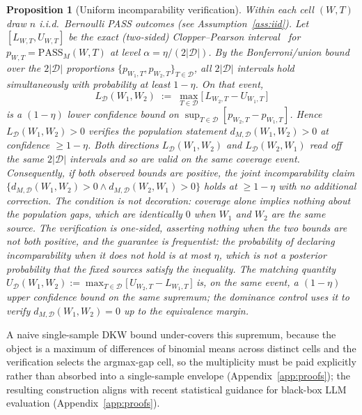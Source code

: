 \documentclass[11pt]{article}
\theoremstyle{plain}
\newtheorem{proposition}{Proposition}
\theoremstyle{definition}
\theoremstyle{remark}
\newcommand{\PASS}{\mathrm{PASS}}
\newcommand{\Dcal}{\mathcal{D}}
\begin{document}
\begin{proposition}[Uniform incomparability verification]
\label{prop:certificate}
Within each cell $(W,T)$ draw $n$ i.i.d.\ Bernoulli PASS outcomes (see
Assumption~\ref{ass:iid}). Let $[L_{W,T},U_{W,T}]$ be the exact (two-sided) Clopper--Pearson
interval~\citep{clopperpearson1934} for $p_{W,T}=\PASS_M(W,T)$ at level
$\alpha = \eta/(2|\Dcal|)$. By the Bonferroni/union bound~\citep{bonferroni1936} over the $2|\Dcal|$
proportions $\{p_{W_1,T},p_{W_2,T}\}_{T\in \Dcal}$, all $2|\Dcal|$ intervals hold simultaneously with
probability at least $1-\eta$. On that event,
\begin{equation}
\label{eq:LD}
L_{\Dcal}(W_1,W_2) \;:=\; \max_{T\in \Dcal}\big[\,L_{W_2,T} - U_{W_1,T}\,\big]
\end{equation}
is a $(1-\eta)$ lower confidence bound on $\sup_{T\in \Dcal}[p_{W_2,T}-p_{W_1,T}]$. Hence
$L_{\Dcal}(W_1,W_2) > 0$ verifies the \emph{population} statement
$d_{M,\Dcal}(W_1,W_2)>0$ at confidence $\ge 1-\eta$.
Both directions $L_{\Dcal}(W_1,W_2)$ and $L_{\Dcal}(W_2,W_1)$ read off the \emph{same} $2|\Dcal|$
intervals and so are valid on the same coverage event. Consequently, \emph{if both observed bounds
are positive}, the joint incomparability claim
$\{d_{M,\Dcal}(W_1,W_2)>0 \wedge d_{M,\Dcal}(W_2,W_1)>0\}$ holds at $\ge 1-\eta$ with no
additional correction. The condition is not decoration: coverage alone implies nothing about the
population gaps, which are identically $0$ when $W_1$ and $W_2$ are the same source. The
verification is one-sided, asserting nothing when the two bounds are not both positive, and the
guarantee is frequentist: the probability of declaring incomparability when it does not hold is at
most $\eta$, which is not a posterior probability that the fixed sources satisfy the inequality. The matching quantity
$U_{\Dcal}(W_1,W_2) := \max_{T\in \Dcal}\big[\,U_{W_2,T} - L_{W_1,T}\,\big]$ is, on the same
event, a $(1-\eta)$ \emph{upper} confidence bound on the same supremum; the dominance control
uses it to verify $d_{M,\Dcal}(W_1,W_2)=0$ up to the equivalence margin.
\end{proposition}

A naive single-sample DKW bound under-covers this supremum, because the object is a maximum of
differences of binomial means across distinct cells and the verification selects the argmax-gap
cell, so the multiplicity must be paid explicitly rather than absorbed into a single-sample
envelope (Appendix~\ref{app:proofs}); the resulting construction aligns with recent statistical
guidance for black-box LLM evaluation (Appendix~\ref{app:proofs}).
\end{document}
